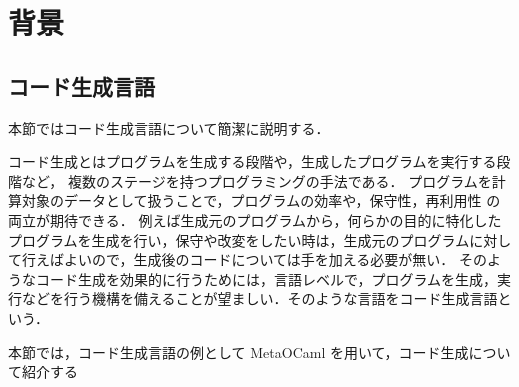 \chapter{背景}

\section{コード生成言語}
本節ではコード生成言語について簡潔に説明する．

コード生成とはプログラムを生成する段階や，生成したプログラムを実行する段階など，
複数のステージを持つプログラミングの手法である．
プログラムを計算対象のデータとして扱うことで，プログラムの効率や，保守性，再利用性 の両立が期待できる．
例えば生成元のプログラムから，何らかの目的に特化したプログラムを生成を行い，保守や改変をしたい時は，生成元のプログラムに対して行えばよいので，生成後のコードについては手を加える必要が無い．
そのようなコード生成を効果的に行うためには，言語レベルで，プログラムを生成，実行などを行う機構を備えることが望ましい．そのような言語をコード生成言語という．

本節では，コード生成言語の例として MetaOCaml を用いて，コード生成について紹介する

